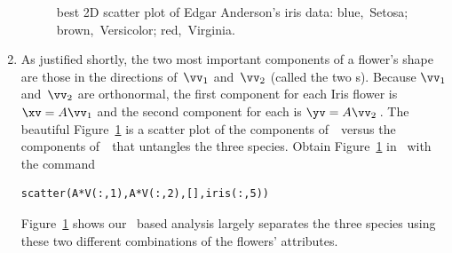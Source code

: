 \begin{example}
\begin{solution}
\begin{enumerate}
\begin{figure}
\centering
{}
\caption{best 2D scatter plot of Edgar Anderson's iris data: blue,~Setosa; brown,~Versicolor; red,~Virginia. }
\label{fig:eaidpca}
\end{figure}%
\item As justified shortly, the two most important components of a flower's shape are those in the directions of~\(\vv_1\) and~\(\vv_2\) (called the two s).
Because \(\vv_1\) and~\(\vv_2\) are orthonormal, the first component for each Iris flower is \(\xv=A\vv_1\) and the second component for each is \(\yv=A\vv_2\)\,.
The beautiful Figure~\ref{fig:eaidpca} is a scatter plot of the components of~\yv\ versus the components of~\xv\ that untangles the three species.
Obtain Figure~\ref{fig:eaidpca} in \script\ with the command
\begin{verbatim}
scatter(A*V(:,1),A*V(:,2),[],iris(:,5))
\end{verbatim}
Figure~\ref{fig:eaidpca} shows our \svd\ based analysis largely separates the three species using these two different combinations of the flowers' attributes.
\end{enumerate}
\end{solution}
\end{example}




